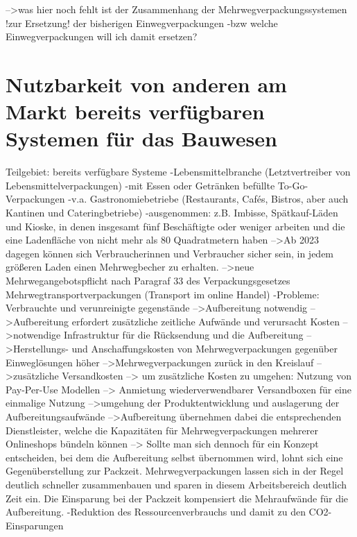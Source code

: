 -->was hier noch fehlt ist der Zusammenhang der Mehrwegverpackungssystemen !zur Ersetzung! der bisherigen Einwegverpackungen
        -bzw welche Einwegverpackungen will ich damit ersetzen?


\section{Nutzbarkeit von anderen am Markt bereits verfügbaren Systemen für das Bauwesen}
\label{Nutzbarkeit von anderen am Markt bereits verfügbaren Systemen für das Bauwesen}

Teilgebiet: bereits verfügbare Systeme 
-Lebensmittelbranche (Letztvertreiber von Lebensmittelverpackungen) 
-mit Essen oder Getränken befüllte To-Go-Verpackungen -v.a. Gastronomiebetriebe (Restaurants, Cafés, Bistros, aber auch Kantinen und Cateringbetriebe)
    -ausgenommen: z.B. Imbisse, Spätkauf-Läden und Kioske, in denen insgesamt fünf Beschäftigte oder weniger arbeiten und die eine Ladenfläche von nicht mehr als 80 Quadratmetern haben 
        –>Ab 2023 dagegen können sich Verbraucherinnen und Verbraucher sicher sein, in jedem größeren Laden einen Mehrwegbecher zu erhalten. 
        –>neue Mehrwegangebotspflicht nach Paragraf 33 des Verpackungsgesetzes Mehrwegtransportverpackungen (Transport im online Handel) 
    -Probleme: Verbrauchte und verunreinigte gegenstände 
        –>Aufbereitung notwendig 
        –>Aufbereitung erfordert zusätzliche zeitliche Aufwände und verursacht Kosten 
        –>notwendige Infrastruktur für die Rücksendung und die Aufbereitung 
        –>Herstellungs- und Anschaffungskosten von Mehrwegverpackungen gegenüber Einweglösungen höher 
        –>Mehrwegverpackungen zurück in den Kreislauf 
        –>zusätzliche Versandkosten 
        –> um zusätzliche Kosten zu umgehen: 
            Nutzung von Pay-Per-Use Modellen 
                –> Anmietung wiederverwendbarer Versandboxen für eine einmalige Nutzung 
                –>umgehung der Produktentwicklung und auslagerung der Aufbereitungsaufwände –>Aufbereitung übernehmen dabei die entsprechenden Dienstleister, welche die Kapazitäten für Mehrwegverpackungen mehrerer Onlineshops bündeln können 
                –> Sollte man sich dennoch für ein Konzept entscheiden, bei dem die Aufbereitung selbst übernommen wird, lohnt sich eine Gegenüberstellung zur Packzeit. Mehrwegverpackungen lassen sich in der Regel deutlich schneller zusammenbauen und sparen in diesem Arbeitsbereich deutlich Zeit ein. Die Einsparung bei der Packzeit kompensiert die Mehraufwände für die Aufbereitung. 
    -Reduktion des Ressourcenverbrauchs und damit zu den CO2-Einsparungen 
